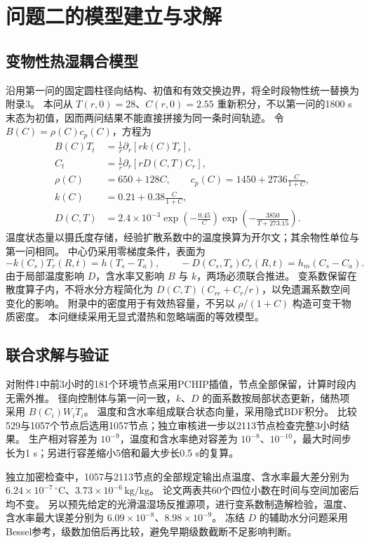\section{问题二的模型建立与求解}
\subsection{变物性热湿耦合模型}
沿用第一问的固定圆柱径向结构、初值和有效交换边界，将全时段物性统一替换为附录3。
本问从 $T(r,0)=28$、$C(r,0)=2.55$ 重新积分，不以第一问的1800 s末态为初值，因而两问结果不能直接拼接为同一条时间轨迹。
令 $B(C)=\rho(C)c_p(C)$，方程为
\begin{align}
B(C)T_t&=\frac1r\partial_r[rk(C)T_r],\label{eq:q2_heat}\\
C_t&=\frac1r\partial_r[rD(C,T)C_r],\label{eq:q2_moisture}\\
\rho(C)&=650+128C,\qquad c_p(C)=1450+2736\frac{C}{1+C},\\
k(C)&=0.21+0.38\frac{C}{1+C},\\
D(C,T)&=2.4\times10^{-3}\exp\left(-\frac{0.45}{C}\right)
\exp\left(-\frac{3850}{T+273.15}\right).
\end{align}
温度状态量以摄氏度存储，经验扩散系数中的温度换算为开尔文；其余物性单位与第一问相同。
中心仍采用零梯度条件，表面为
\begin{equation}
-k(C_s)T_r(R,t)=h(T_s-T_a),\qquad
-D(C_s,T_s)C_r(R,t)=h_m(C_s-C_a).
\end{equation}
由于局部温度影响 $D$，含水率又影响 $B$ 与 $k$，两场必须联合推进。
变系数保留在散度算子内，不将水分方程简化为 $D(C,T)(C_{rr}+C_r/r)$，以免遗漏系数空间变化的影响。
附录中的密度用于有效热容量，不另以 $\rho/(1+C)$ 构造可变干物质密度。
本问继续采用无显式潜热和忽略端面的等效模型。

\subsection{联合求解与验证}
对附件1中前3小时的181个环境节点采用PCHIP插值，节点全部保留，计算时段内无需外推。
径向控制体与第一问一致，$k$、$D$ 的面系数按局部状态更新，储热项采用 $B(C_i)W_i\dot T_i$。
温度和含水率组成联合状态向量，采用隐式BDF积分。
比较529与1057个节点后选用1057节点；独立审核进一步以2113节点检查完整3小时结果。
生产相对容差为 $10^{-9}$，温度和含水率绝对容差为 $10^{-8}$、$10^{-10}$，最大时间步长为1 s；另进行容差缩小5倍和最大步长0.5 s的复算。

独立加密检查中，1057与2113节点的全部规定输出点温度、含水率最大差分别为
$6.24\times10^{-7}\,^\circ\mathrm C$、$3.73\times10^{-6}\,\mathrm{kg/kg}$。
论文两表共60个四位小数在时间与空间加密后均不变。
另以预先给定的光滑温湿场反推源项，进行变系数制造解检验，温度、含水率最大误差分别为 $6.09\times10^{-8}$、$8.98\times10^{-9}$。
冻结 $D$ 的辅助水分问题采用Bessel参考，级数加倍后再比较，避免早期级数截断不足影响判断。

